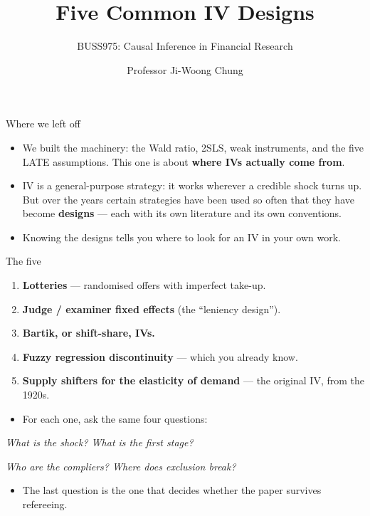 \documentclass[
  11pt,
  ignorenonframetext,
  aspectratio=169,
]{beamer}
\title{\texorpdfstring{Five Common IV Designs}{Five Common IV Designs}}
\subtitle{\texorpdfstring{BUSS975: Causal Inference in Financial
Research}{BUSS975: Causal Inference in Financial Research}}
\author{Professor Ji-Woong Chung}
\date{}
\institute{Korea University}
\providecommand{\tightlist}{%
  \setlength{\itemsep}{0pt}\setlength{\parskip}{0pt}}
\begin{document}
\frame{\titlepage}


\begin{frame}{Where we left off}
\protect{}\label{where-we-left-off}
\begin{itemize}
\tightlist
\item
  We built the machinery: the Wald ratio, 2SLS, weak instruments, and
  the five LATE assumptions. This one is about \textbf{where IVs
  actually come from}.
\item
  IV is a general-purpose strategy: it works wherever a credible shock
  turns up. But over the years certain strategies have been used so
  often that they have become \textbf{designs} --- each with its own
  literature and its own conventions.
\item
  Knowing the designs tells you where to look for an IV in your own
  work.
\end{itemize}
\end{frame}

\begin{frame}{The five}
\protect{}\label{the-five}
\vspace{0.3em}

\begin{enumerate}
\tightlist
\item
  \textbf{Lotteries} --- randomised offers with imperfect take-up.
\item
  \textbf{Judge / examiner fixed effects} (the ``leniency design'').
\item
  \textbf{Bartik, or shift-share, IVs.}
\item
  \textbf{Fuzzy regression discontinuity} --- which you already know.
\item
  \textbf{Supply shifters for the elasticity of demand} --- the original
  IV, from the 1920s.
\end{enumerate}

\vspace{0.6em}

\begin{itemize}
\tightlist
\item
  For each one, ask the same four questions:
\end{itemize}

\vspace{0.2em}

\begin{center}
\emph{What is the shock? \quad What is the first stage?} 
\end{center}
\begin{center}
\emph{Who are the compliers? \quad Where does exclusion break?}
\end{center}

\vspace{0.3em}

\begin{itemize}
\tightlist
\item
  The last question is the one that decides whether the paper survives
  refereeing.
\end{itemize}
\end{frame}
\end{document}
